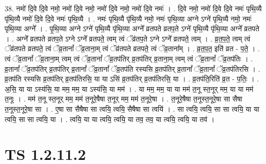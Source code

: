 \documentclass[17pt]{extarticle}
\begin{document}
38. नमो॑ दि॒वे दि॒वे नमो॒ नमो॑ दि॒वे नमो॒ नमो॑ दि॒वे नमो॒ नमो॑ दि॒वे नमः॑ । . दि॒वे नमो॒ नमो॑ दि॒वे दि॒वे नमः॑ पृथि॒व्यै पृ॑थि॒व्यै नमो॑ दि॒वे दि॒वे नमः॑ पृथि॒व्यै । . नमः॑ पृथि॒व्यै पृ॑थि॒व्यै नमो॒ नमः॑ पृथि॒व्या अग्ने ऽग्ने॑ पृथि॒व्यै नमो॒ नमः॑ पृथि॒व्या अग्ने᳚ । . पृ॒थि॒व्या अग्ने ऽग्ने॑ पृथि॒व्यै पृ॑थि॒व्या अग्ने᳚ व्रतपते व्रतप॒ते ऽग्ने॑ पृथि॒व्यै पृ॑थि॒व्या अग्ने᳚ व्रतपते । . अग्ने᳚ व्रतपते व्रतप॒ते ऽग्ने ऽग्ने᳚ व्रतपते॒ त्वम् त्वं ॅव्र॑तप॒ते ऽग्ने ऽग्ने᳚ व्रतपते॒ त्वम् । . व्र॒त॒प॒ते॒ त्वम् त्वं ॅव्र॑तपते व्रतपते॒ त्वं ॅव्र॒तानां᳚ ॅव्र॒ताना॒म् त्वं ॅव्र॑तपते व्रतपते॒ त्वं ॅव्र॒ताना᳚म् । . व्र॒त॒प॒त॒ इति॑ व्रत - प॒ते॒ । . त्वं ॅव्र॒तानां᳚ ॅव्र॒ताना॒म् त्वम् त्वं ॅव्र॒तानां᳚ ॅव्र॒तप॑तिर् व्र॒तप॑तिर् व्र॒ताना॒म् त्वम् त्वं ॅव्र॒तानां᳚ ॅव्र॒तप॑तिः । . व्र॒तानां᳚ ॅव्र॒तप॑तिर् व्र॒तप॑तिर् व्र॒तानां᳚ ॅव्र॒तानां᳚ ॅव्र॒तप॑ति रस्यसि व्र॒तप॑तिर् व्र॒तानां᳚ ॅव्र॒तानां᳚ ॅव्र॒तप॑तिरसि । . व्र॒तप॑ति रस्यसि व्र॒तप॑तिर् व्र॒तप॑तिरसि॒ या या ऽसि॑ व्र॒तप॑तिर् व्र॒तप॑तिरसि॒ या । . व्र॒तप॑ति॒रिति॑ व्र॒त - प॒तिः॒ । . अ॒सि॒ या या ऽस्य॑सि॒ या मम॒ मम॒ या ऽस्य॑सि॒ या मम॑ । . या मम॒ मम॒ या या मम॑ त॒नू स्त॒नूर् मम॒ या या मम॑ त॒नूः । . मम॑ त॒नू स्त॒नूर् मम॒ मम॑ त॒नूरे॒षैषा त॒नूर् मम॒ मम॑ त॒नूरे॒षा । . त॒नूरे॒षैषा त॒नूस्त॒नूरे॒षा सा सैषा त॒नूस्त॒नूरे॒षा सा । . ए॒षा सा सैषैषा सा त्वयि॒ त्वयि॒ सैषैषा सा त्वयि॑ । . सा त्वयि॒ त्वयि॒ सा सा त्वयि॒ या या त्वयि॒ सा सा त्वयि॒ या । . त्वयि॒ या या त्वयि॒ त्वयि॒ या तव॒ तव॒ या त्वयि॒ त्वयि॒ या तव॑ । \newline
\pagebreak
{}

\section{ TS 1.2.11.2 }
\end{document}
